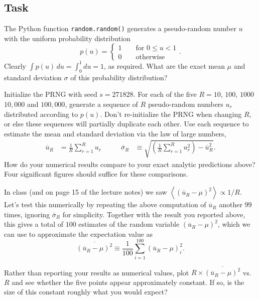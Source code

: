 \documentclass[12 pt]{article} %
\newcommand{\ubar}{\ensuremath{\overline u} }
\newcommand{\si}{\ensuremath{\sigma} }
\newcommand{\sibar}{\ensuremath{\overline\sigma} }
\newcommand{\vev}[1]{\ensuremath{\left\langle #1 \right\rangle} }
\newcommand{\showmarks}[1]{\rightline{\texttt{[#1 marks]}}} %
\begin{document}
\subsection*{Task}
The Python function \texttt{random.random()} generates a pseudo-random number $u$ with the uniform probability distribution
\begin{equation}
  \label{eq:uniform}
  p(u) = \left\{\begin{array}{l}1 \qquad \mbox{for } 0 \leq u < 1 \\
                                0 \qquad \mbox{otherwise}\end{array}\right. .
\end{equation}
Clearly $\int p(u) \, du = \int_0^1 du = 1$, as required.
What are the exact mean $\mu$ and standard deviation \si of this probability distribution?

\showmarks{2}

Initialize the PRNG with seed $s = 271828$.
For each of the five $R = 10$, $100$, $1000$ $10{,}000$ and $100{,}000$, generate a sequence of $R$ pseudo-random numbers $u_r$ distributed according to $p(u)$.
Don't re-initialize the PRNG when changing $R$, or else these sequences will partially duplicate each other.
Use each sequence to estimate the mean and standard deviation via the law of large numbers,
\begin{align}
  \label{eq:mean}
  \ubar_R & = \frac{1}{R} \sum_{r = 1}^R u_r \qquad &
  \sibar_R & \equiv \sqrt{\left(\frac{1}{R} \sum_{r = 1}^R u_r^2\right) - \ubar_R^2}.
\end{align}
How do your numerical results compare to your exact analytic predictions above?
Four significant figures should suffice for these comparisons.

\showmarks{5}

In class (and on page 15 of the lecture notes) we saw $\displaystyle \vev{\left(\ubar_R - \mu\right)^2} \propto 1 / R$.
Let's test this numerically by repeating the above computation of $\ubar_R$ another $99$ times, ignoring $\sibar_R$ for simplicity.
Together with the result you reported above, this gives a total of $100$ estimates of the random variable $\left(\ubar_R - \mu\right)^2$, which we can use to approximate the expectation value as
\begin{equation}
  \overline{\left(\ubar_R - \mu\right)^2} \equiv \frac{1}{100} \sum_{i = 1}^{100} \left(\ubar_R - \mu\right)_i^2.
\end{equation}

Rather than reporting your results as numerical values, plot $R \times \overline{\left(\ubar_R - \mu\right)^2}$ vs.\ $R$ and see whether the five points appear approximately constant.
If so, is the size of this constant roughly what you would expect?
\end{document}
